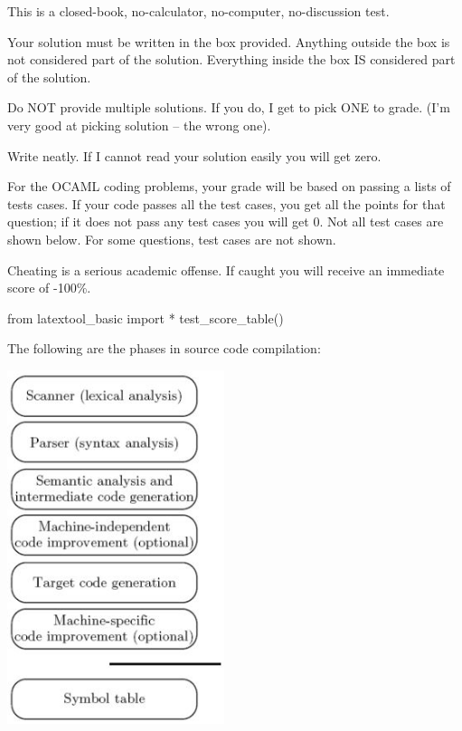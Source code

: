 

\renewcommand\AUTHOR{} %


\topmattertwo

\begin{enumerate}

\li This is a closed-book, no-calculator, no-computer, no-discussion test.

\li Your solution must be written in the box provided. Anything outside the box
is not considered part of the solution.
Everything inside the box IS considered part of the solution.

\li Do NOT provide multiple solutions. If you do, I get to pick ONE to grade.
(I'm very good at picking solution -- the wrong one).

\li Write neatly. If I cannot read your solution easily you will get zero.

\li
For the OCAML coding problems,
your grade will be based on passing a lists of tests cases.
If your code passes all the test cases,
you get all the points for that question;
if it does not pass any test cases you will get 0.
Not all test cases are shown below.
For some questions, test cases are not shown.

\li 
Cheating is a serious academic offense. If caught you will receive an
immediate score
of -100\%.

\end{enumerate}

\newpage
\begin{python}
from latextool_basic import *
test_score_table()
\end{python}



\newpage
\nextq
The following are the phases in source code compilation:

\begin{center}
\includegraphics[width=2.5in]{pic.JPG}
\end{center}

